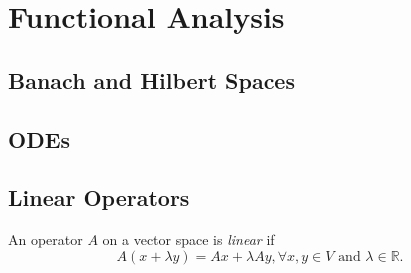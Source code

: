 \documentclass[a4paper]{book}
\def\R{\mathbb{R}}
\begin{document}
\part{Functional Analysis}
\chapter{Banach and Hilbert Spaces}
\chapter{ODEs}
\chapter{Linear Operators}
\begin{myDef}[Linear]
    An operator $A$ on a vector space is \emph{linear} if
    \[
        A(x+\lambda y)=Ax+\lambda Ay, \forall x, y \in V \text{ and } \lambda \in \R.
    \]
\end{myDef}
\end{document}
